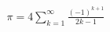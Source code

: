 \documentclass[preview]{standalone}
\begin{document}
\begin{align*}
\pi  = 4  \sum _{k=1}^{ \infty } \frac{  (-1)^{k+1}  }{  2k - 1  }
\end{align*}
\end{document}
